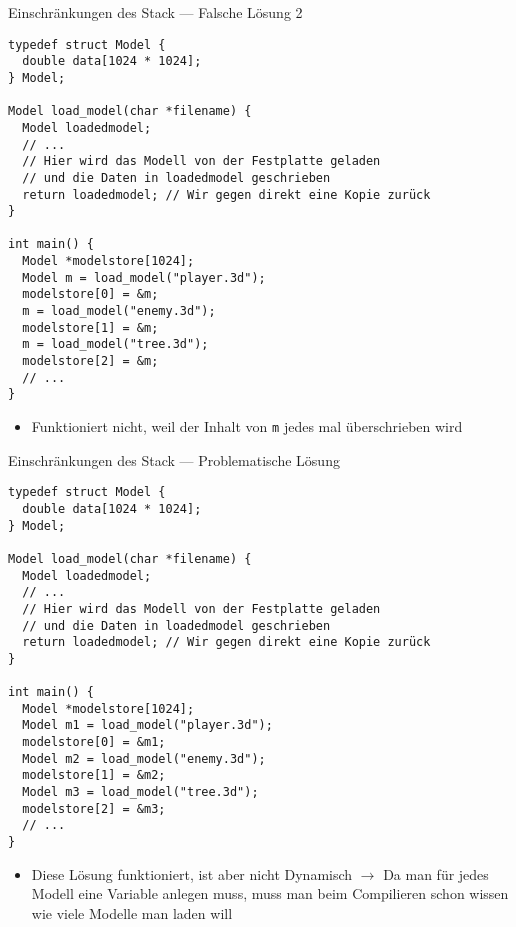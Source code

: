 \documentclass[presentation]{beamer}
\begin{document}
\begin{frame}[label={sec:org3a3e1b1},fragile]{Einschränkungen des Stack --- Falsche Lösung 2}
 \begin{verbatim}
typedef struct Model {
  double data[1024 * 1024];
} Model;

Model load_model(char *filename) {
  Model loadedmodel;
  // ...
  // Hier wird das Modell von der Festplatte geladen
  // und die Daten in loadedmodel geschrieben
  return loadedmodel; // Wir gegen direkt eine Kopie zurück
}

int main() {
  Model *modelstore[1024];
  Model m = load_model("player.3d");
  modelstore[0] = &m;
  m = load_model("enemy.3d");
  modelstore[1] = &m;
  m = load_model("tree.3d");
  modelstore[2] = &m;
  // ...
}
\end{verbatim}
\begin{itemize}
\item Funktioniert nicht, weil der Inhalt von {\color{solarizedYellow}\verb!m!} jedes mal überschrieben
wird
\end{itemize}
\end{frame}
\begin{frame}[label={sec:org6492c3a},fragile]{Einschränkungen des Stack --- Problematische Lösung}
 \begin{verbatim}
typedef struct Model {
  double data[1024 * 1024];
} Model;

Model load_model(char *filename) {
  Model loadedmodel;
  // ...
  // Hier wird das Modell von der Festplatte geladen
  // und die Daten in loadedmodel geschrieben
  return loadedmodel; // Wir gegen direkt eine Kopie zurück
}

int main() {
  Model *modelstore[1024];
  Model m1 = load_model("player.3d");
  modelstore[0] = &m1;
  Model m2 = load_model("enemy.3d");
  modelstore[1] = &m2;
  Model m3 = load_model("tree.3d");
  modelstore[2] = &m3;
  // ...
}
\end{verbatim}
\footnotesize
\begin{itemize}
\item Diese Lösung funktioniert, ist aber nicht Dynamisch \(\rightarrow\) Da
man für jedes Modell eine Variable anlegen muss, muss man beim
Compilieren schon wissen wie viele Modelle man laden will
\end{itemize}
\end{frame}
\end{document}
